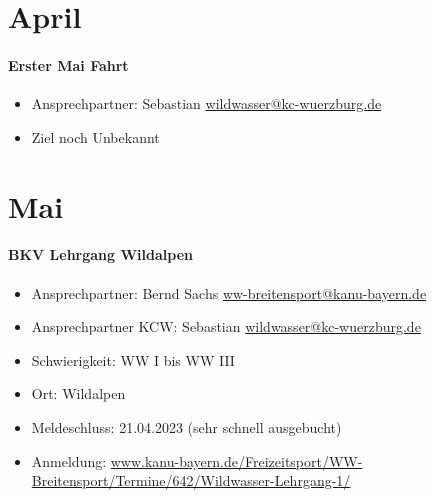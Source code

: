 \documentclass[12pt, a4paper]{report}
\begin{document}
\section*{April}\paragraph{Erster Mai Fahrt}
\begin{itemize}
    \item Ansprechpartner: Sebastian \href{mailto:wildwasser@kc-wuerzburg.de}{wildwasser@kc-wuerzburg.de}
    \item Ziel noch Unbekannt
\end{itemize}

\section*{Mai}\paragraph{BKV Lehrgang Wildalpen}
\begin{itemize}
    \item Ansprechpartner: Bernd Sachs \href{mailto:ww-breitensport@kanu-bayern.de}{ww-breitensport@kanu-bayern.de}
    \item Ansprechpartner KCW: Sebastian \href{mailto:wildwasser@kc-wuerzburg.de}{wildwasser@kc-wuerzburg.de}
    \item Schwierigkeit: WW I bis WW III
    \item Ort: Wildalpen
    \item Meldeschluss: 21.04.2023 (sehr schnell ausgebucht)
    \item Anmeldung: \url{www.kanu-bayern.de/Freizeitsport/WW-Breitensport/Termine/642/Wildwasser-Lehrgang-1/}
\end{itemize}
\end{document}
